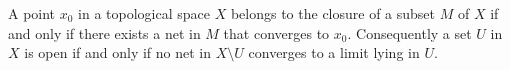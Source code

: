 A point $x_0$ in a topological space $X$ belongs to the closure of a subset $M$ of $X$ if and only if there exists a net in $M$ that converges to $x_0$. Consequently a set $U$ in $X$ is open if and only if no net in $X \setminus U$ converges to a limit lying in $U$.
